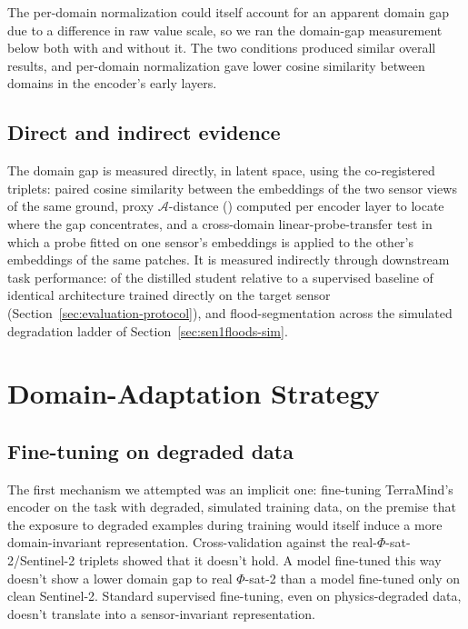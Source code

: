 The per-domain normalization could itself account for an apparent domain gap due to a difference in raw value scale, so we ran the domain-gap measurement below both with and without it.
The two conditions produced similar overall results, and per-domain normalization gave lower cosine similarity between domains in the encoder's early layers.

\subsection{Direct and indirect evidence}

The domain gap is measured directly, in latent space, using the co-registered triplets: paired cosine similarity between the embeddings of the two sensor views of the same ground, proxy $\mathcal{A}$-distance () computed per encoder layer to locate where the gap concentrates, and a cross-domain linear-probe-transfer test in which a probe fitted on one sensor's embeddings is applied to the other's embeddings of the same patches.
It is measured indirectly through downstream task performance:   of the distilled student relative to a supervised baseline of identical architecture trained directly on the target sensor (Section~\ref{sec:evaluation-protocol}), and flood-segmentation  across the simulated degradation ladder of Section~\ref{sec:sen1floods-sim}.

\section{Domain-Adaptation Strategy}
\label{sec:da-mechanism}

\subsection{Fine-tuning on degraded data}
\label{sec:da-negative-result}

The first mechanism we attempted was an implicit one: fine-tuning TerraMind's encoder on the  task with degraded, simulated training data, on the premise that the exposure to degraded examples during training would itself induce a more domain-invariant representation.
Cross-validation against the real-$\Phi$-sat-2/Sentinel-2 triplets showed that it doesn't hold.
A model fine-tuned this way doesn't show a lower domain gap to real $\Phi$-sat-2 than a model fine-tuned only on clean Sentinel-2.
Standard supervised fine-tuning, even on physics-degraded data, doesn't translate into a sensor-invariant representation.

